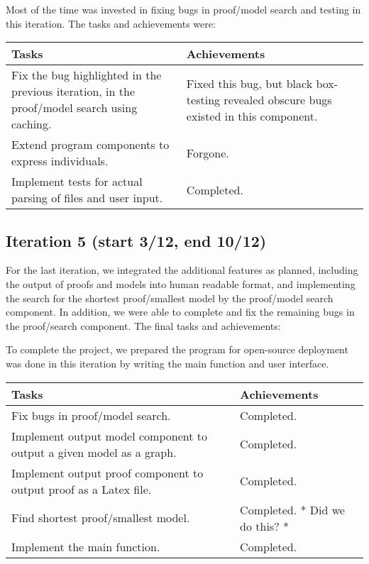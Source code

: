 Most of the time was invested in fixing bugs in proof/model search and testing in this iteration. The tasks and achievements were:

\begin{center}
\begin{longtable}{| p{7cm} | p{8cm} |}
\hline
\textbf{Tasks} & \textbf{Achievements} \\
\hline
Fix the bug highlighted in the previous iteration, in the proof/model search using caching.	& Fixed this bug, but black box-testing revealed obscure bugs existed in this component.\\
\hline
Extend program components to express individuals.	& Forgone.\\
\hline
Implement tests for actual parsing of files and user input. & Completed.\\
\hline
\end{longtable}
\end{center}

\subsection*{Iteration 5 (start 3/12, end 10/12)}

For the last iteration, we integrated the additional features as planned, including the output of proofs and models into human readable format, and implementing the search for the shortest proof/smallest model by the proof/model search component. In addition, we were able to complete and fix the remaining bugs in the proof/search component. The final tasks and achievements:

To complete the project, we prepared the program for open-source deployment was done in this iteration by writing the main function and user interface.

\begin{center}
\begin{longtable}{| p{7cm} | p{8cm} |}
\hline
\textbf{Tasks} & \textbf{Achievements} \\
\hline
Fix bugs in proof/model search. & Completed.\\
\hline
Implement output model component to output a given model as a graph. & Completed.\\
\hline
Implement output proof component to output proof as a Latex file. & Completed.\\
\hline
Find shortest proof/smallest model. & Completed. * Did we do this? *\\
\hline
Implement the main function. & Completed.\\
\hline
\end{longtable}
\end{center}

